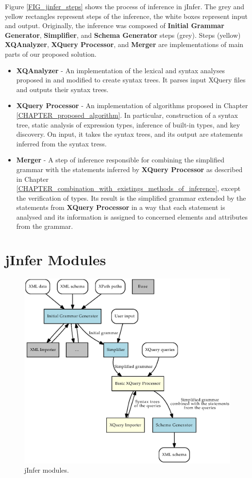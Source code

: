 Figure \ref{FIG_jinfer_steps} shows the process of inference in jInfer. The grey and yellow rectangles represent steps of the inference, the white boxes represent input and output. Originally, the inference was composed of \textbf{Initial Grammar Generator}, \textbf{Simplifier}, and \textbf{Schema Generator} steps (grey). Steps (yellow) \textbf{XQAnalyzer}, \textbf{XQuery Processor}, and \textbf{Merger} are implementations of main parts of our proposed solution.

\begin{itemize}
\item \textbf{XQAnalyzer} - An implementation of the lexical and syntax analyses proposed in \cite{thesis_schejbal} and modified to create syntax trees. It parses input XQuery files and outputs their syntax trees.
\item \textbf{XQuery Processor} - An implementation of algorithms proposed in Chapter \ref{CHAPTER_proposed_algorithm}. In particular, construction of a syntax tree, static analysis of expression types, inference of built-in types, and key discovery. On input, it takes the syntax trees, and its output are statements inferred from the syntax tress. 
\item \textbf{Merger} - A step of inference responsible for combining the simplified grammar with the statements inferred by \textbf{XQuery Processor} as described in Chapter \ref{CHAPTER_combination_with_existings_methods_of_inference}, except the verification of types. Its result is the simplified grammar extended by the statements from \textbf{XQuery Processor} in a way that each statement is analysed and its information is assigned to concerned elements and attributes from the grammar. 
\end{itemize}

\section{jInfer Modules}
\begin{figure}
\includegraphics[scale=0.8]{jinfer_modules.eps}
\caption{jInfer modules.}
\label{FIG_jinfer_modules}
\end{figure}


